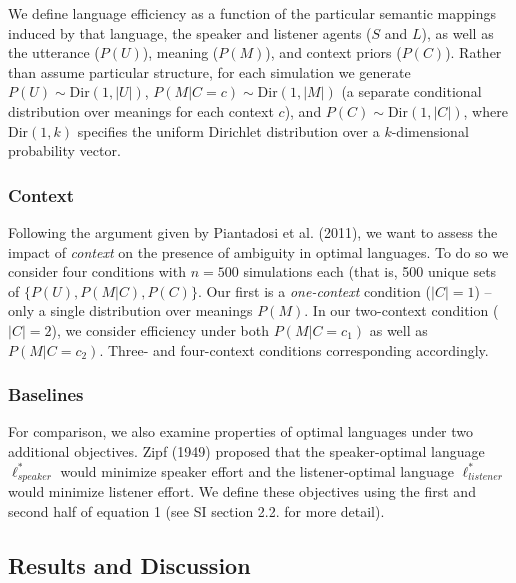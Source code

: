 \documentclass[10pt, letterpaper]{article}
\begin{document}
We define language efficiency as a function of the particular semantic
mappings induced by that language, the speaker and listener agents
(\(S\) and \(L\)), as well as the utterance (\(P(U)\)), meaning
(\(P(M)\)), and context priors (\(P(C)\)). Rather than assume particular
structure, for each simulation we generate
\(P(U) \sim \text{Dir}(1, |U|)\), \(P(M|C=c) \sim \text{Dir}(1, |M|)\)
(a separate conditional distribution over meanings for each context
\(c\)), and \(P(C) \sim \text{Dir}(1, |C|)\), where \(\text{Dir}(1, k)\)
specifies the uniform Dirichlet distribution over a \(k\)-dimensional
probability vector.\par

\subsubsection{Context}\label{context}

Following the argument given by Piantadosi et al. (2011), we want to
assess the impact of \emph{context} on the presence of ambiguity in
optimal languages. To do so we consider four conditions with \(n=500\)
simulations each (that is, 500 unique sets of
\(\{P(U), P(M|C), P(C)\}\). Our first is a \emph{one-context} condition
(\(|C|=1\)) -- only a single distribution over meanings \(P(M)\). In our
two-context condition (\(|C| = 2\)), we consider efficiency under both
\(P(M|C=c_1)\) as well as \(P(M|C=c_2)\). Three- and four-context
conditions corresponding accordingly.\par

\subsubsection{Baselines}\label{baselines}

For comparison, we also examine properties of optimal languages under
two additional objectives. Zipf (1949) proposed that the speaker-optimal
language \(\ell_{speaker}^*\) would minimize speaker effort and the
listener-optimal language \(\ell_{listener}^*\) would minimize listener
effort. We define these objectives using the first and second half of
equation 1 (see SI section 2.2. for more detail).\par

\subsection{Results and Discussion}\label{results-and-discussion}
\end{document}
